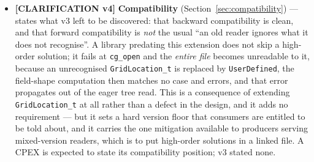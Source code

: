 \documentclass[11pt,letterpaper]{article}
\newif\ifvfourdraft
\newenvironment{v4block}{\ifvfourdraft\color{v4violet}\fi\ignorespaces}{\par}
\newcommand{\CLARIFYIV}{\ifvfourdraft
  \textcolor{v4violet}{\textbf{[CLARIFICATION v4]}}\else
  \textcolor{clarifybrown}{\textbf{[CLARIFICATION v4]}}\fi}
\begin{document}
{\begin{v4block}
\begin{itemize}[nosep,leftmargin=1.5em]
  \item \CLARIFYIV{} \textbf{Compatibility} (Section~\ref{sec:compatibility}) ---
    states what v3 left to be discovered: that backward compatibility is clean, and
    that forward compatibility is \emph{not} the usual ``an old reader ignores what
    it does not recognise''.  A library predating this extension does not skip a
    high-order solution; it fails at \texttt{cg\_open} and the \emph{entire file}
    becomes unreadable to it, because an unrecognised \texttt{GridLocation\_t} is
    replaced by \texttt{UserDefined}, the field-shape computation then matches no
    case and errors, and that error propagates out of the eager tree read.  This is
    a consequence of extending \texttt{GridLocation\_t} at all rather than a defect
    in the design, and it adds no requirement --- but it sets a hard version floor
    that consumers are entitled to be told about, and it carries the one mitigation
    available to producers serving mixed-version readers, which is to put
    high-order solutions in a linked file.  A CPEX is expected to state its
    compatibility position; v3 stated none.
\end{itemize}


\end{v4block}}
\end{document}
